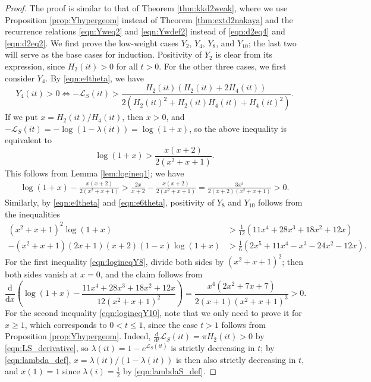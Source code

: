 \documentclass[10pt,reqno]{amsproc}
\newcommand{\dd}{\mathrm{d}}
\newcommand{\cL}{\mathcal{L}}
\newcommand{\1}{\mathds{1}}	%
\theoremstyle{definition}
\theoremstyle{remark}
\begin{document}
\begin{proof}
    The proof is similar to that of Theorem \ref{thm:kkd2weak}, where we use Proposition \ref{prop:Yhypergeom} instead of Theorem \ref{thm:extd2nakaya} and the recurrence relations \eqref{eqn:Yweq2} and \eqref{eqn:Ywdef2} instead of \eqref{eqn:d2eq4} and \eqref{eqn:d2eq2}.
    We first prove the low-weight cases $Y_2$, $Y_4$, $Y_8$, and $Y_{10}$; the last two will serve as the base cases for induction.
    Positivity of $Y_2$ is clear from its expression, since $H_2(it) > 0$ for all $t > 0$.
    For the other three cases, we first consider $Y_4$.
    By \eqref{eqn:e4theta}, we have
    \[
        Y_4(it) > 0 \Leftrightarrow - \cL_S(it) > \frac{H_2(it)(H_2(it) + 2H_4(it))}{2(H_2(it)^2 + H_2(it) H_4(it) + H_4(it)^2)}.
    \]
    If we put $x = H_2(it) / H_4(it)$, then $x > 0$, and $-\cL_S(it) = -\log(1 - \lambda(it)) = \log(1+x)$, so the above inequality is equivalent to
    \begin{equation}
        \label{eqn:logineqY4}
        \log(1 + x) > \frac{x(x+2)}{2(x^2 + x + 1)}.
    \end{equation}
    This follows from Lemma \ref{lem:logineq1}; we have
    \begin{align*}
        \log(1 + x) - \frac{x(x+2)}{2(x^2 + x + 1)} > \frac{2x}{x+2} - \frac{x(x+2)}{2(x^2 + x + 1)} = \frac{3x^3}{2(x+2)(x^2 + x + 1)} > 0.
    \end{align*}
    Similarly, by \eqref{eqn:e4theta} and \eqref{eqn:e6theta}, positivity of $Y_8$ and $Y_{10}$ follows from the inequalities
    \begin{align}
        (x^2+x+1)^2 \log(1+x) &> \frac{1}{12} (11 x^4 + 28 x^3 + 18 x^2 + 12 x) \label{eqn:logineqY8} \\
        -(x^2+x+1)(2x+1)(x+2)(1-x) \log(1+x) &> \frac{1}{6} (2 x^5 + 11 x^4 - x^3 - 24 x^2 - 12 x). \label{eqn:logineqY10}
    \end{align}
    For the first inequality \eqref{eqn:logineqY8}, divide both sides by $(x^2+x+1)^2$; then both sides vanish at $x = 0$, and the claim follows from
    \[
        \frac{\dd}{\dd x} \left(\log(1 + x) - \frac{11x^4 + 28x^3 + 18x^2 + 12x}{12(x^2 + x + 1)^2}\right) = \frac{x^4 (2x^2 + 7x + 7)}{2(x+1)(x^2 + x + 1)^3} > 0.
    \]
    For the second inequality \eqref{eqn:logineqY10}, note that we only need to prove it for $x \ge 1$, which corresponds to $0 < t \le 1$, since the case $t > 1$ follows from Proposition \ref{prop:Yhypergeom}.
    Indeed, $\frac{\dd}{\dd t} \cL_S(it) = \pi H_2(it) > 0$ by \eqref{eqn:LS_derivative}, so $\lambda(it) = 1 - e^{\cL_S(it)}$ is strictly decreasing in $t$; by \eqref{eqn:lambda_def}, $x = \lambda(it) / (1 - \lambda(it))$ is then also strictly decreasing in $t$, and $x(1) = 1$ since $\lambda(i) = \frac{1}{2}$ by \eqref{eqn:lambdaS_def}.

\end{proof}
\end{document}
